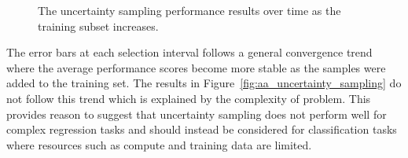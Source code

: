 \documentclass[conference]{IEEEtran}
\begin{document}
\begin{figure}[htbp]
		\hfil
		\caption{The uncertainty sampling performance results over time as the training subset increases.}
		\label{fig:uncertainty_sampling_all}
	\end{figure}
	
	The error bars at each selection interval follows a general convergence trend where the average performance scores become more stable as the samples were added to the training set. The results in Figure~\ref{fig:aa_uncertainty_sampling} do not follow this trend which is explained by the complexity of problem. This provides reason to suggest that uncertainty sampling does not perform well for complex regression tasks and should instead be considered for classification tasks where resources such as compute and training data are limited.
	
\end{document}
